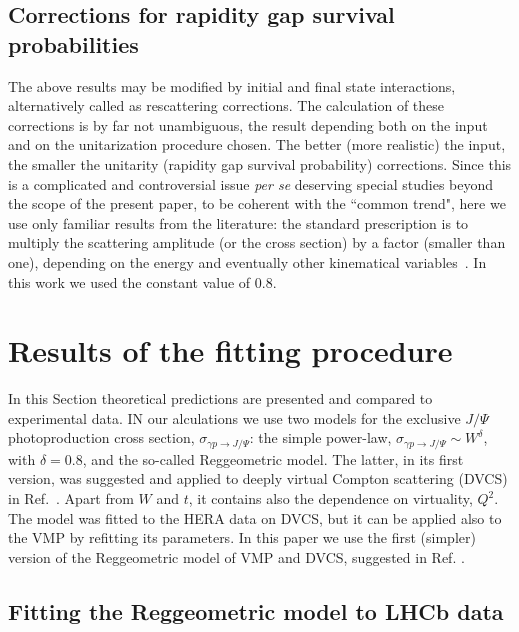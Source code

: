 \documentclass[12pt]{article}
\begin{document}
\subsection{Corrections for rapidity gap survival probabilities}\label{corrections}
The above results may be modified by initial and final state interactions,
alternatively called as rescattering corrections. The calculation of these
corrections is by far not unambiguous, the result depending both on the input
and on the unitarization procedure chosen. The better (more realistic) the input, the smaller the unitarity (rapidity gap survival probability) corrections.
Since this is a complicated and controversial issue {\it per se} deserving special studies beyond the scope of the present paper, to be coherent with the ``common trend", here we use only familiar results from the literature:
the standard prescription is to multiply the scattering amplitude (or the cross section) by a factor (smaller than one), depending on the energy and eventually other kinematical variables~\cite{Ryskin}.
In this work we used the constant value of 0.8.

\section{Results of the fitting procedure}

In this Section theoretical predictions are presented and compared to experimental data.
IN our alculations we use two models for the exclusive $J/\Psi$ photoproduction cross section, $\sigma_{\gamma p \to J/\Psi}$:
the simple power-law, $\sigma_{\gamma p \to J/\Psi}\sim W^\delta$, with $\delta=0.8$, and the so-called Reggeometric model.
The latter, in its first version, was suggested and applied to deeply virtual Compton scattering (DVCS) in Ref.~\cite{Capua}.
Apart from $W$ and $t$, it contains also the dependence on virtuality, $Q^2$.
The model was fitted to the HERA data on DVCS, but it can be applied also to the VMP by refitting its parameters.
In this paper we use the first (simpler) version of the Reggeometric model of VMP and DVCS, suggested in Ref. \cite{FFJS}.

\subsection{Fitting the  Reggeometric model to LHCb data}
\end{document}
